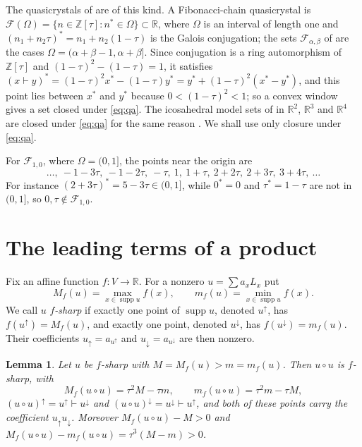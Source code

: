 \documentclass[11pt]{amsart}
\newtheorem{lemma}[theorem]{Lemma}
\theoremstyle{definition}
\theoremstyle{remark}
\newcommand{\R}{\mathbb{R}}
\newcommand{\Z}{\mathbb{Z}}
\newcommand{\qa}{\vdash}
\newcommand{\supp}{\operatorname{supp}}
\newcommand{\up}{{\uparrow}}
\newcommand{\dn}{{\downarrow}}
\begin{document}
The quasicrystals of \cite{CCAI23,CCAI25} are of this kind. A Fibonacci-chain quasicrystal is $\mathcal F(\Omega)=\{n\in\Z[\tau]:n^*\in\Omega\}\subset\R$, where $\Omega$ is an interval of length one and $(n_1+n_2\tau)^*=n_1+n_2(1-\tau)$ is the Galois conjugation; the sets $\mathcal F_{\alpha,\beta}$ of \cite{CCAI23} are the cases $\Omega=(\alpha+\beta-1,\alpha+\beta]$. Since conjugation is a ring automorphism of $\Z[\tau]$ and $(1-\tau)^2-(1-\tau)=1$, it satisfies $(x\qa y)^*=(1-\tau)^2x^*-(1-\tau)y^*=y^*+(1-\tau)^2(x^*-y^*)$, and this point lies between $x^*$ and $y^*$ because $0<(1-\tau)^2<1$; so a convex window gives a set closed under \eqref{eq:qa}. The icosahedral model sets of \cite{CCAI25} in $\R^2$, $\R^3$ and $\R^4$ are closed under \eqref{eq:qa} for the same reason \cite[Section~4]{CCAI25}. We shall use only closure under \eqref{eq:qa}.

For $\mathcal F_{1,0}$, where $\Omega=(0,1]$, the points near the origin are
\[
\dots,\ -1-3\tau,\ -1-2\tau,\ -\tau,\ 1,\ 1+\tau,\ 2+2\tau,\ 2+3\tau,\ 3+4\tau,\ \dots
\]
For instance $(2+3\tau)^*=5-3\tau\in(0,1]$, while $0^*=0$ and $\tau^*=1-\tau$ are not in $(0,1]$, so $0,\tau\notin\mathcal F_{1,0}$.

\section{The leading terms of a product}

Fix an affine function $f\colon V\to\R$. For a nonzero $u=\sum a_xL_x$ put
\[
M_f(u)=\max_{x\in\supp u}f(x),\qquad m_f(u)=\min_{x\in\supp u}f(x).
\]
We call $u$ \emph{$f$-sharp} if exactly one point of $\supp u$, denoted $u^\up$, has $f(u^\up)=M_f(u)$, and exactly one point, denoted $u^\dn$, has $f(u^\dn)=m_f(u)$. Their coefficients $u_\up=a_{u^\up}$ and $u_\dn=a_{u^\dn}$ are then nonzero.

\begin{lemma}\label{lem:square}
Let $u$ be $f$-sharp with $M=M_f(u)>m=m_f(u)$. Then $u\circ u$ is $f$-sharp, with
\[
M_f(u\circ u)=\tau^2M-\tau m,\qquad m_f(u\circ u)=\tau^2m-\tau M,
\]
$(u\circ u)^\up=u^\up\qa u^\dn$ and $(u\circ u)^\dn=u^\dn\qa u^\up$, and both of these points carry the coefficient $u_\up u_\dn$. Moreover $M_f(u\circ u)-M>0$ and $M_f(u\circ u)-m_f(u\circ u)=\tau^3(M-m)>0$.
\end{lemma}
\end{document}
